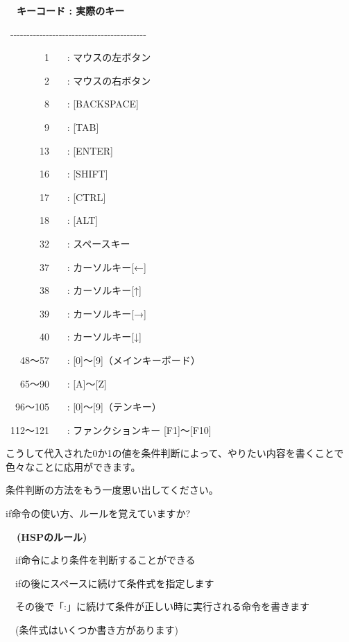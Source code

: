 \documentclass[a4paper,12pt]{jarticle}
\begin{document}
{\bfseries
\ \ キーコード : 実際のキー

\ {}-{}-{}-{}-{}-{}-{}-{}-{}-{}-{}-{}-{}-{}-{}-{}-{}-{}-{}-{}-{}-{}-{}-{}-{}-{}-{}-{}-{}-{}-{}-{}-{}-{}-{}-{}-{}-{}-{}-{}-{}-{}-

\ \ \ \ \ \ \ \ 1 \ \ \ : マウスの左ボタン

\ \ \ \ \ \ \ \ 2 \ \ \ : マウスの右ボタン

\ \ \ \ \ \ \ \ 8 \ \ \ : [BACKSPACE]

\ \ \ \ \ \ \ \ 9 \ \ \ : [TAB]

\ \ \ \ \ \ \ 13 \ \ \ : [ENTER]

\ \ \ \ \ \ \ 16 \ \ \ : [SHIFT]

\ \ \ \ \ \ \ 17 \ \ \ : [CTRL]

\ \ \ \ \ \ \ 18 \ \ \ : [ALT]

\ \ \ \ \ \ \ 32 \ \ \ : スペースキー

\ \ \ \ \ \ \ 37 \ \ \ : カーソルキー[←]

\ \ \ \ \ \ \ 38 \ \ \ : カーソルキー[↑]

\ \ \ \ \ \ \ 39 \ \ \ : カーソルキー[→]

\ \ \ \ \ \ \ 40 \ \ \ : カーソルキー[↓]

\ \ \ 48〜57 \ \ \ : [0]〜[9]（メインキーボード）

\ \ \ 65〜90 \ \ \ : [A]〜[Z]

\ \ 96〜105 \ \ \ : [0]〜[9]（テンキー）

\ 112〜121 \ \ \ : ファンクションキー [F1]〜[F10]}

\bigskip

こうして代入された0か1の値を条件判断によって、やりたい内容を書くことで色々なことに応用ができます。

\clearpage

\bigskip

条件判断の方法をもう一度思い出してください。

if命令の使い方、ルールを覚えていますか?


\bigskip

{\bfseries
\ \ (HSPのルール)

\bigskip

\ \ if命令により条件を判断することができる

\ \ ifの後にスペースに続けて条件式を指定します

\ \ その後で「:」に続けて条件が正しい時に実行される命令を書きます}

\bigskip

\ \ (条件式はいくつか書き方があります)
\end{document}
